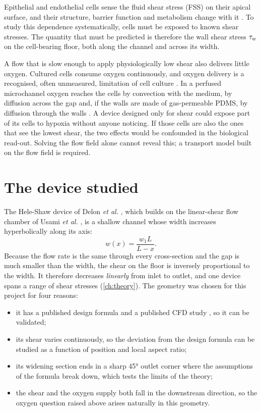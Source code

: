 Epithelial and endothelial cells sense the fluid shear stress (FSS) on their apical surface, and their structure, barrier function and metabolism change with it \citep{Delon2019,Delon2020}. To study this dependence systematically, cells must be exposed to known shear stresses. The quantity that must be predicted is therefore the wall shear stress $\tau_{w}$ on the cell-bearing floor, both along the channel and across its width.

A flow that is slow enough to apply physiologically low shear also delivers little oxygen. Cultured cells consume oxygen continuously, and oxygen delivery is a recognised, often unmeasured, limitation of cell culture \citep{Place2017,Wagner2011}. In a perfused microchannel oxygen reaches the cells by convection with the medium, by diffusion across the gap and, if the walls are made of gas-permeable PDMS, by diffusion through the walls \citep{Mehta2007}. A device designed only for shear could expose part of its cells to hypoxia without anyone noticing. If those cells are also the ones that see the lowest shear, the two effects would be confounded in the biological read-out. Solving the flow field alone cannot reveal this; a transport model built on the flow field is required.

\section{The device studied}

The Hele-Shaw device of Delon \emph{et al.} \citep{Delon2020}, which builds on the linear-shear flow chamber of Usami \emph{et al.} \citep{Usami1993}, is a shallow channel whose width increases hyperbolically along its axis:
\begin{equation}
w(x)=\frac{w_1L}{L-x}.
\label{eq:intro_width}
\end{equation}
Because the flow rate is the same through every cross-section and the gap is much smaller than the width, the shear on the floor is inversely proportional to the width. It therefore decreases \emph{linearly} from inlet to outlet, and one device spans a range of shear stresses (\cref{ch:theory}). The geometry was chosen for this project for four reasons:
\begin{itemize}
\item it has a published design formula and a published CFD study \citep{Delon2020}, so it can be validated;
\item its shear varies continuously, so the deviation from the design formula can be studied as a function of position and local aspect ratio;
\item its widening section ends in a sharp \ang{45} outlet corner where the assumptions of the formula break down, which tests the limits of the theory;
\item the shear and the oxygen supply both fall in the downstream direction, so the oxygen question raised above arises naturally in this geometry.
\end{itemize}


